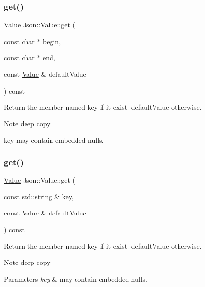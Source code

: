 \subsubsection{\texorpdfstring{get()}{get()}\hspace{0.1cm}{\footnotesize\ttfamily [3/4]}}
{\footnotesize\ttfamily \hyperlink{class_json_1_1_value}{Value} Json\+::\+Value\+::get (\begin{DoxyParamCaption}\item[{const char $\ast$}]{begin,  }\item[{const char $\ast$}]{end,  }\item[{const \hyperlink{class_json_1_1_value}{Value} \&}]{default\+Value }\end{DoxyParamCaption}) const}

Return the member named key if it exist, default\+Value otherwise. \begin{DoxyNote}{Note}
deep copy 

key may contain embedded nulls. 
\end{DoxyNote}
\mbox{\label{class_json_1_1_value_af17414293cffc973cee466372d8dc151}} 
\subsubsection{\texorpdfstring{get()}{get()}\hspace{0.1cm}{\footnotesize\ttfamily [4/4]}}
{\footnotesize\ttfamily \hyperlink{class_json_1_1_value}{Value} Json\+::\+Value\+::get (\begin{DoxyParamCaption}\item[{const std\+::string \&}]{key,  }\item[{const \hyperlink{class_json_1_1_value}{Value} \&}]{default\+Value }\end{DoxyParamCaption}) const}

Return the member named key if it exist, default\+Value otherwise. \begin{DoxyNote}{Note}
deep copy 
\end{DoxyNote}

\begin{DoxyParams}{Parameters}
{\em key} & may contain embedded nulls. \\
\hline
\end{DoxyParams}
\mbox{\label{class_json_1_1_value_a79d7725dce6260317333e69022367ac9}} 
